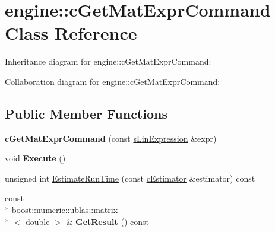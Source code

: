 \hypertarget{classengine_1_1cGetMatExprCommand}{\section{engine\-:\-:c\-Get\-Mat\-Expr\-Command Class Reference}
\label{classengine_1_1cGetMatExprCommand}
}


Inheritance diagram for engine\-:\-:c\-Get\-Mat\-Expr\-Command\-:


Collaboration diagram for engine\-:\-:c\-Get\-Mat\-Expr\-Command\-:
\subsection*{Public Member Functions}
\begin{DoxyCompactItemize}
\item 
\hypertarget{classengine_1_1cGetMatExprCommand_a5aa0b4ea3da91ed9b9438b12e409ecd7}{{\bfseries c\-Get\-Mat\-Expr\-Command} (const \hyperlink{structengine_1_1sLinExpression}{s\-Lin\-Expression} \&expr)}\label{classengine_1_1cGetMatExprCommand_a5aa0b4ea3da91ed9b9438b12e409ecd7}

\item 
\hypertarget{classengine_1_1cGetMatExprCommand_a29cf2191f93572f0d08f5515a7e0c499}{void {\bfseries Execute} ()}\label{classengine_1_1cGetMatExprCommand_a29cf2191f93572f0d08f5515a7e0c499}

\item 
unsigned int \hyperlink{classengine_1_1cGetMatExprCommand_a6a9c787618267539be3004983c3d1747}{Estimate\-Run\-Time} (const \hyperlink{classengine_1_1cEstimator}{c\-Estimator} \&estimator) const 
\item 
\hypertarget{classengine_1_1cGetMatExprCommand_a1f8554fa8dcc2f17d5587e6ccdd4f84d}{const \\*
boost\-::numeric\-::ublas\-::matrix\\*
$<$ double $>$ \& {\bfseries Get\-Result} () const }\label{classengine_1_1cGetMatExprCommand_a1f8554fa8dcc2f17d5587e6ccdd4f84d}

\end{DoxyCompactItemize}
